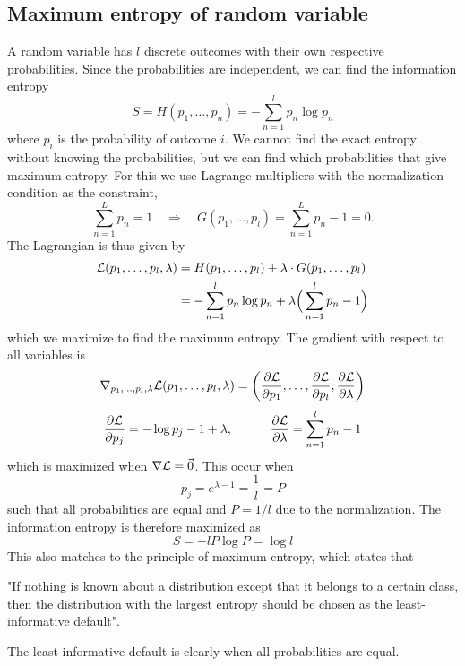 \documentclass[norsk,a4paper,12pt]{article}
\begin{document}
\subsection{Maximum entropy of random variable}
A random variable has $l$ discrete outcomes with their own respective probabilities. Since the probabilities are independent, we can find the information entropy
\begin{equation}
S=H(p_1,\hdots,p_n)=-\sum_{n=1}^lp_n\log p_n
\label{entropy}
\end{equation}
where $p_i$ is the probability of outcome $i$. We cannot find the exact entropy without knowing the probabilities, but we can find which probabilities that give maximum entropy. For this we use Lagrange multipliers with the normalization condition as the constraint,
\begin{equation}
\sum_{n=1}^Lp_n=1\quad\Rightarrow\quad G(p_1,\hdots,p_l)=\sum_{n=1}^Lp_n-1=0.
\end{equation}
The Lagrangian is thus given by
\begin{align}
{\cal L}(p_1,\hdots,p_l,\lambda)&=H(p_1,\hdots,p_l)+\lambda\cdot G(p_1, \hdots,p_l)\\
&=-\sum_{n=1}^lp_n\log p_n + \lambda\Big(\sum_{n=1}^lp_n-1\Big)
\end{align}
which we maximize to find the maximum entropy. The gradient with respect to all variables is
\begin{equation}
\nabla_{p_1,\hdots,p_l,\lambda}{\cal L}(p_1,\hdots,p_l,\lambda)=\bigg(\frac{\partial {\cal L}}{\partial p_1},\hdots,\frac{\partial {\cal L}}{\partial p_l},\frac{\partial {\cal L}}{\partial \lambda}\bigg)
\end{equation}
\begin{equation}
\frac{\partial {\cal L}}{\partial p_j}=-\log p_j-1+\lambda,\quad\quad\quad \frac{\partial {\cal L}}{\partial \lambda}=\sum_{n=1}^lp_n-1
\end{equation}
which is maximized when $\nabla{\cal L}=\vec{0}$. This occur when 
\begin{equation}
p_j=e^{\lambda-1}=\frac{1}{l}=P
\end{equation}
such that all probabilities are equal and $P=1/l$ due to the normalization. The information entropy is therefore maximized as
\begin{equation}
S=-lP\log P=\log l
\end{equation}
This also matches to the principle of maximum entropy, which states that
\begin{displayquote}
"If nothing is known about a distribution except that it belongs to a certain class, then the distribution with the largest entropy should be chosen as the least-informative default".
\end{displayquote}
The least-informative default is clearly when all probabilities are equal.
\end{document}
